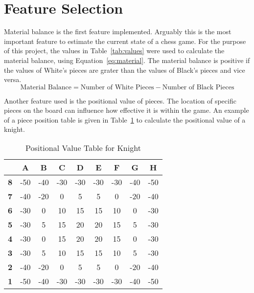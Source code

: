 \section{Feature Selection}

Material balance is the first feature implemented. Arguably this is the most important feature to estimate the current state of a chess game. For the purpose of this project, the values in Table~\ref{tab:values} were used to calculate the material balance, using Equation~\ref{eq:material}. The material balance is positive if the values of White's pieces are grater than the values of Black's pieces and vice versa.
\begin{equation}
    \label{eq:material}
    \text{Material Balance} = \text{Number of White Pieces} - \text{Number of Black Pieces} 
\end{equation}

Another feature used is the positional value of pieces. The location of specific pieces on the board can influence how effective it is within the game. An example of a piece position table is given in Table~\ref{tab:knight_positional_values} to calculate the positional value of a knight.

\begin{table}[h]
    \centering
    \begin{tabular}{|c|c|c|c|c|c|c|c|c|}
        \hline
        \textbf{} & \textbf{A} & \textbf{B} & \textbf{C} & \textbf{D} & \textbf{E} & \textbf{F} & \textbf{G} & \textbf{H} \\
        \hline
        \textbf{8} & -50 & -40 & -30 & -30 & -30 & -30 & -40 & -50 \\
        \textbf{7} & -40 & -20 & 0 & 5 & 5 & 0 & -20 & -40 \\
        \textbf{6} & -30 & 0 & 10 & 15 & 15 & 10 & 0 & -30 \\
        \textbf{5} & -30 & 5 & 15 & 20 & 20 & 15 & 5 & -30 \\
        \textbf{4} & -30 & 0 & 15 & 20 & 20 & 15 & 0 & -30 \\
        \textbf{3} & -30 & 5 & 10 & 15 & 15 & 10 & 5 & -30 \\
        \textbf{2} & -40 & -20 & 0 & 5 & 5 & 0 & -20 & -40 \\
        \textbf{1} & -50 & -40 & -30 & -30 & -30 & -30 & -40 & -50 \\
        \hline
    \end{tabular}
    \caption{Positional Value Table for Knight}
    \label{tab:knight_positional_values}
\end{table}

